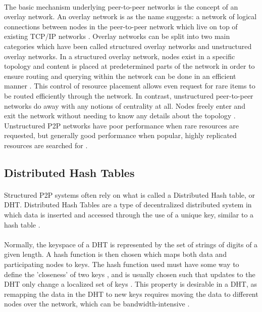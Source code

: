 \documentclass[12pt,letterpaper]{article}
\begin{document}
\paragraph{}
The basic mechanism underlying peer-to-peer networks is the concept of an overlay network.
An overlay network is as the name suggests: a network of logical connections between nodes in the peer-to-peer network which live on top of existing TCP/IP networks \cite{overlay}.
Overlay networks can be split into two main categories which have been called structured overlay networks and unstructured overlay networks.
In a structured overlay network, nodes exist in a specific topology and content is placed at predetermined parts of the network in order to ensure routing and querying within the network can be done in an efficient manner \cite{overlay}.
This control of resource placement allows even request for rare items to be routed efficiently through the network.
In contrast, unstructured peer-to-peer networks do away with any notions of centrality at all.
Nodes freely enter and exit the network without needing to know any details about the topology \cite{overlay}.
Unstructured P2P networks have poor performance when rare resources are requested, but generally good performance when popular, highly replicated resources are searched for \cite{overlay}.

\subsection{Distributed Hash Tables}
\label{DHT}

\paragraph{}
Structured P2P systems often rely on what is called a Distributed Hash table, or DHT. 
Distributed Hash Tables are a type of decentralized distributed system in which data is inserted and accessed through the use of a unique key, similar to a hash table \cite{dht}\cite{wiki-dht}.

\paragraph{}
Normally, the keyspace of a DHT is represented by the set of strings of digits of a given length.
A hash function is then chosen which maps both data and participating nodes to keys.
The hash function used must have some way to define the 'closeness' of two keys \cite{dht}, and is usually chosen such that updates to the DHT only change a localized set of keys \cite{wiki-dht}.
This property is desirable in a DHT, as remapping the data in the DHT to new keys requires moving the data to different nodes over the network, which can be bandwidth-intensive \cite{wiki-dht}.
\end{document}
